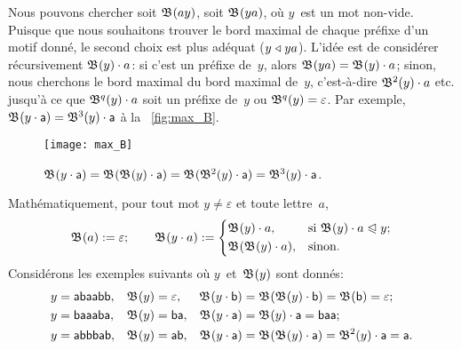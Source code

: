 Nous pouvons chercher soit \(\mathfrak{B}^{}(ay)\), soit \(\mathfrak{B}^{}(ya)\),
où \(y\)~est un mot non-vide. Puisque que nous souhaitons trouver le
bord maximal de chaque préfixe d'un motif donné, le second choix est
plus adéquat (\(y \mathrel{\triangleleft} ya\)). L'idée est de considérer récursivement
\(\mathfrak{B}^{}(y) \cdot a\): si c'est un préfixe de~\(y\), alors
\(\mathfrak{B}^{}(ya) = \mathfrak{B}^{}(y) \cdot a\); sinon, nous cherchons le
bord maximal du bord maximal de~\(y\), c'est-à-dire \(\mathfrak{B}^{2}(y)
\cdot a\) etc. jusqu'à ce que \(\mathfrak{B}^{q}(y) \cdot a\) soit un
préfixe de~\(y\) ou \(\mathfrak{B}^{q}(y) = \varepsilon\). Par exemple,
\(\mathfrak{B}^{}(y \cdot \textsf{a}) = \mathfrak{B}^{3}(y) \cdot \textsf{a}\) à la
\fig~\vref{fig:max_B}.
\begin{figure}[b]
\centering
\texttt{[image: max\_B]}
\caption{\(\mathfrak{B}^{}(y \cdot \textsf{a})
   = \mathfrak{B}^{}(\mathfrak{B}^{}(y) \cdot \textsf{a})
   = \mathfrak{B}^{}(\mathfrak{B}^{2}(y) \cdot \textsf{a})
   = \mathfrak{B}^{3}(y) \cdot \textsf{a}\).}
\label{fig:max_B}
\end{figure}

Mathématiquement, pour tout mot \({y \neq \varepsilon}\) et toute lettre~\(a\),
\begin{equation}
  \mathfrak{B}^{}(a)         := \varepsilon;\qquad
  \mathfrak{B}^{}(y \cdot a) := \left\{
    \begin{aligned}
      & \mathfrak{B}^{}(y) \cdot a,
      && \text{si \(\mathfrak{B}^{}(y) \cdot a \mathrel{\trianglelefteqslant}y\)};\\
      & \mathfrak{B}^{}(\mathfrak{B}^{}(y) \cdot a),
      && \text{sinon.}
    \end{aligned}
  \right.
\label{eq:Border}
\end{equation}
Considérons les exemples suivants où \(y\)~et~\(\mathfrak{B}^{}(y)\) sont donnés:
\begin{align*}
  y             &= \textsf{abaabb},
& \mathfrak{B}^{}(y)  &= \varepsilon,
& \mathfrak{B}^{}(y \cdot \textsf{b})
                &= \mathfrak{B}^{}(\mathfrak{B}^{}(y) \cdot \textsf{b})
                 = \mathfrak{B}^{}(\textsf{b}) = \varepsilon;\\
  y             &= \textsf{baaaba},
& \mathfrak{B}^{}(y)  &= \textsf{ba},
& \mathfrak{B}^{}(y \cdot \textsf{a})
                &= \mathfrak{B}^{}(y) \cdot \textsf{a}
                 = \textsf{baa};\\
  y             &= \textsf{abbbab},
& \mathfrak{B}^{}(y)  &= \textsf{ab},
& \mathfrak{B}^{}(y \cdot \textsf{a})
                &= \mathfrak{B}^{}(\mathfrak{B}^{}(y) \cdot \textsf{a})
                 = \mathfrak{B}^{2}(y) \cdot \textsf{a}
                 = \textsf{a}.
\end{align*}

